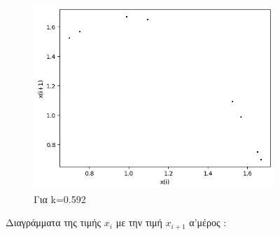 \begin{figure}[h!]
\begin{subfigure}[b]{0.4\textwidth}
		\includegraphics[width=\textwidth]{LateX images/graphs q07/g7}
		\caption{Για k=0.592}
		\label{f:k41}
	\end{subfigure}
	\hfill
	\caption{Διαγράμματα της τιμής \(x_i\) με την τιμή \(x_{i+1}\) α'μέρος :}
\end{figure}
